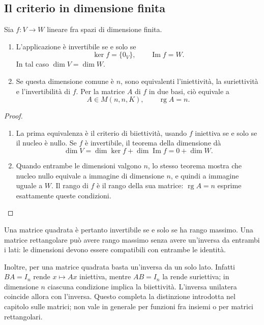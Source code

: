 \subsection{Il criterio in dimensione finita}
\begin{teorema}
Sia $f:V\to W$ lineare fra spazi di dimensione finita. \begin{enumerate}[label=\arabic*.]
\item L'applicazione è invertibile se e solo se
\[
 \ker f=\{0_V\},\qquad \operatorname{Im}f=W.
\]
In tal caso $\dim V=\dim W$.
\item Se questa dimensione comune è $n$, sono equivalenti l'iniettività, la suriettività e l'invertibilità di $f$. Per la matrice $A$ di $f$ in due basi, ciò equivale a
\[
 A\in M(n,n,K),\qquad \operatorname{rg}A=n.
\]
\end{enumerate}
\end{teorema}
\begin{proof}
\begin{enumerate}[label=\arabic*.]
\item La prima equivalenza è il criterio di biiettività, usando $f$ iniettiva se e solo se il nucleo è nullo. Se $f$ è invertibile, il teorema della dimensione dà
\[
 \dim V=\dim\ker f+\dim\operatorname{Im}f=0+\dim W.
\]
\item Quando entrambe le dimensioni valgono $n$, lo stesso teorema mostra che nucleo nullo equivale a immagine di dimensione $n$, e quindi a immagine uguale a $W$. Il rango di $f$ è il rango della sua matrice: $\operatorname{rg}A=n$ esprime esattamente queste condizioni.
\end{enumerate}
\end{proof}
Una matrice quadrata è pertanto invertibile se e solo se ha rango massimo. Una matrice rettangolare può avere rango massimo senza avere un'inversa da entrambi i lati: le dimensioni devono essere compatibili con entrambe le identità.

Inoltre, per una matrice quadrata basta un'inversa da un solo lato. Infatti $BA=I_n$ rende $x\mapsto Ax$ iniettiva, mentre $AB=I_n$ la rende suriettiva; in dimensione $n$ ciascuna condizione implica la biiettività. L'inversa unilatera coincide allora con l'inversa. Questo completa la distinzione introdotta nel capitolo sulle matrici; non vale in generale per funzioni fra insiemi o per matrici rettangolari.

